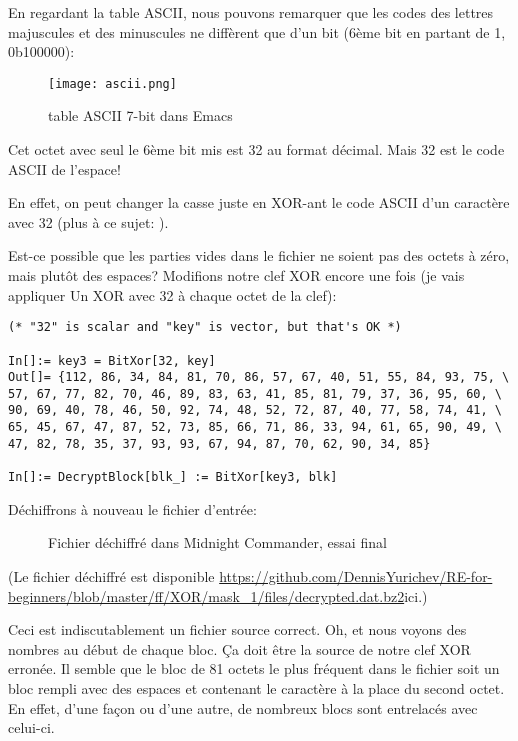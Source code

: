En regardant la table ASCII, nous pouvons remarquer que les codes des lettres majuscules
et des minuscules ne diffèrent que d'un bit (6ème bit en partant de 1, 0b100000):

\begin{figure}[H]
\centering
\texttt{[image: ascii.png]}
\caption{table \ac{ASCII} 7-bit dans Emacs}
\end{figure}

Cet octet avec seul le 6ème bit mis est 32 au format décimal.
Mais 32 est le code ASCII de l'espace!

En effet, on peut changer la casse juste en XOR-ant le code ASCII d'un caractère
avec 32 (plus à ce sujet: ).

Est-ce possible que les parties vides dans le fichier ne soient pas des octets à zéro,
mais plutôt des espaces?
Modifions notre clef XOR encore une fois (je vais appliquer Un XOR avec 32 à chaque
octet de la clef):

\begin{lstlisting}[style=custommath]
(* "32" is scalar and "key" is vector, but that's OK *)

In[]:= key3 = BitXor[32, key]
Out[]= {112, 86, 34, 84, 81, 70, 86, 57, 67, 40, 51, 55, 84, 93, 75, \
57, 67, 77, 82, 70, 46, 89, 83, 63, 41, 85, 81, 79, 37, 36, 95, 60, \
90, 69, 40, 78, 46, 50, 92, 74, 48, 52, 72, 87, 40, 77, 58, 74, 41, \
65, 45, 67, 47, 87, 52, 73, 85, 66, 71, 86, 33, 94, 61, 65, 90, 49, \
47, 82, 78, 35, 37, 93, 93, 67, 94, 87, 70, 62, 90, 34, 85}

In[]:= DecryptBlock[blk_] := BitXor[key3, blk]
\end{lstlisting}

Déchiffrons à nouveau le fichier d'entrée:

\begin{figure}[H]
\centering
{}
\caption{Fichier déchiffré dans Midnight Commander, essai final}
\end{figure}

(Le fichier déchiffré est disponible
\url{https://github.com/DennisYurichev/RE-for-beginners/blob/master/ff/XOR/mask_1/files/decrypted.dat.bz2}{ici}.)

Ceci est indiscutablement un fichier source correct.
Oh, et nous voyons des nombres au début de chaque bloc. Ça doit être la source de
notre clef XOR erronée.
Il semble que le bloc de 81 octets le plus fréquent dans le fichier soit un bloc
rempli avec des espaces et contenant le caractère  à la place du second octet.
En effet, d'une façon ou d'une autre, de nombreux blocs sont entrelacés avec celui-ci.

